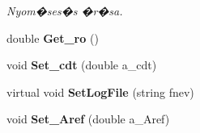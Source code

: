 \begin{DoxyCompactItemize}
\begin{DoxyCompactList}\small\item\em Nyom�ses�s �r�sa. \end{DoxyCompactList}\item 
double {\bfseries Get\+\_\+ro} ()\hypertarget{class_agelem_a9d3b5645c32c2d07b163e1270138a2b2}{}\label{class_agelem_a9d3b5645c32c2d07b163e1270138a2b2}

\item 
void {\bfseries Set\+\_\+cdt} (double a\+\_\+cdt)\hypertarget{class_agelem_a045cfd41234f268b8f923a452df080c5}{}\label{class_agelem_a045cfd41234f268b8f923a452df080c5}

\item 
virtual void {\bfseries Set\+Log\+File} (string fnev)\hypertarget{class_agelem_a4d4a42d36256dd6c55a548934269f33c}{}\label{class_agelem_a4d4a42d36256dd6c55a548934269f33c}

\item 
void {\bfseries Set\+\_\+\+Aref} (double a\+\_\+\+Aref)\hypertarget{class_agelem_ab0d58b657fe3300b4e10b70898cf5119}{}\label{class_agelem_ab0d58b657fe3300b4e10b70898cf5119}

\end{DoxyCompactItemize}
